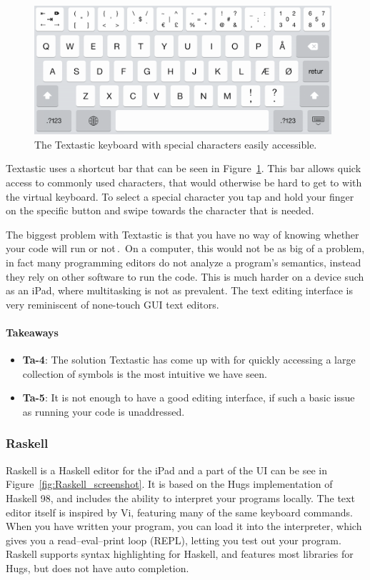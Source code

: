 \begin{figure}
	\centering
		\includegraphics[width=110mm]{diagrams/textastic_keyboard_screenshot.png}
	\caption{The Textastic keyboard with special characters easily accessible.}
\label{fig:textastic_keyboard_screenshot}
\end{figure}

Textastic uses a shortcut bar that can be seen in Figure~\ref{fig:textastic_keyboard_screenshot}. This bar allows quick access to commonly used characters, that would otherwise be hard to get to with the virtual keyboard. To select a special character you tap and hold your finger on the specific button and swipe towards the character that is needed. 

The biggest problem with Textastic is that you have no way of knowing whether your code will run or not\,\cite{nielsen1990heuristic}.\ On a computer, this would not be as big of a problem, in fact many programming editors do not analyze a program's semantics, instead they rely on other software to run the code. This is much harder on a device such as an iPad, where multitasking is not as prevalent. The text editing interface is very reminiscent of none-touch GUI text editors.

\paragraph{Takeaways}
\begin{itemize}
	\item \textbf{Ta-4}: The solution Textastic has come up with for quickly accessing a large collection of symbols is the most intuitive we have seen.
	\item \textbf{Ta-5}: It is not enough to have a good editing interface, if such a basic issue as running your code is unaddressed.
\end{itemize}


\subsubsection{Raskell}
\label{subsub:Raskell}
Raskell is a Haskell editor for the iPad and a part of the UI can be see in Figure~\ref{fig:Raskell_screenshot}. It is based on the Hugs implementation of Haskell 98, and includes the ability to interpret your programs locally. The text editor itself is inspired by Vi, featuring many of the same keyboard commands. When you have written your program, you can load it into the interpreter, which gives you a read–eval–print loop (REPL), letting you test out your program. Raskell supports syntax highlighting for Haskell, and features most libraries for Hugs, but does not have auto completion.

